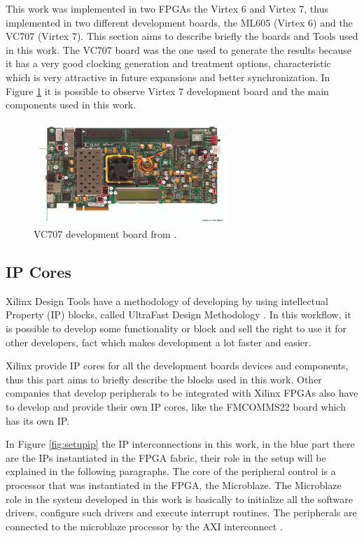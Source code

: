 This work was implemented in two FPGAs the Virtex 6 and Virtex 7, thus
implemented in two different development boards, the ML605 (Virtex 6) and the
VC707 (Virtex 7). This section aims to describe briefly the boards and Tools
used in this work. The VC707 board was the one used to generate the results
because it has a very good clocking generation and treatment options,
characteristic which is very attractive in future expansions and better
synchronization. In Figure \ref{fig:vc707} it is possible to observe Virtex 7
development board and the main components used in this work.

\begin{figure}[htbp]
    \centering
    \includegraphics[width=0.65\textwidth]{./figures/vc707}
    \caption{ VC707 development board from \cite{xilinx:vc707}.
    \label{fig:vc707}}
\end{figure}

\subsection{IP Cores}

Xilinx Design Tools have a methodology of developing by using intellectual
Property (IP) blocks, called UltraFast Design Methodology
\cite{xilinx:ultrafast}. In this workflow, it is possible to develop some
functionality or block and sell the right to use it for other developers, fact
which makes development a lot faster and easier.

Xilinx provide IP cores for all the development boards devices and components,
thus this part aims to briefly describe the blocks used in this work. Other
companies that develop peripherals to be integrated with Xilinx FPGAs also have
to develop and provide their own IP cores, like the FMCOMMS22 board which has its
own IP.

In Figure \ref{fig:setupip} the IP interconnections in this work, in the blue
part there are the IPs instantiated in the FPGA fabric, their role in the setup
will be explained in the following paragraphs. The core of the peripheral
control is a processor that was instantiated in the FPGA, the Microblaze. The
Microblaze role in the system developed in this work is basically to initialize
all the software drivers, configure such drivers and execute interrupt
routines. The peripherals are connected to the microblaze processor by the AXI
interconnect \cite{xilinx:axiconn}.

